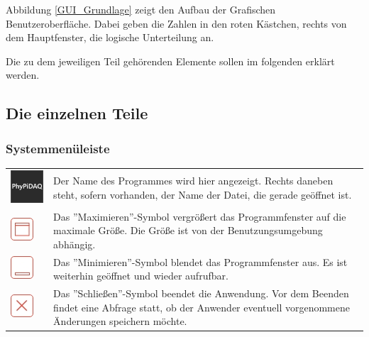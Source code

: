 \documentclass[parskip=full]{scrartcl}
\begin{document}
Abbildung \ref{GUI_Grundlage} zeigt den Aufbau der Grafischen Benutzeroberfläche. Dabei geben die Zahlen in den roten Kästchen, rechts von dem Hauptfenster, die logische Unterteilung an.

Die zu dem jeweiligen Teil gehörenden Elemente sollen im folgenden erklärt werden.

\subsection{Die einzelnen Teile}

\subsubsection{Systemmenüleiste}

\begin{tabular}[t]{p{1cm} p{10cm}}
	\vspace{0cm}\includegraphics[width = 1 cm]{Grafik/PhyPiDAQ.jpg} & Der Name des Programmes wird hier angezeigt. Rechts daneben steht, sofern vorhanden, der Name der Datei, die gerade geöffnet ist.\newline\\
	\vspace{0cm}\includegraphics[width = 1 cm]{Grafik/Maximieren.jpg} & Das ''Maximieren''-Symbol vergrößert das Programmfenster auf die maximale Größe. Die Größe ist von der Benutzungsumgebung abhängig.\newline\\
	\vspace{0cm}\includegraphics[width = 1 cm]{Grafik/Minimieren.jpg} & Das ''Minimieren''-Symbol blendet das Programmfenster aus. Es ist weiterhin geöffnet und wieder aufrufbar. \\
	\vspace{0cm}\includegraphics[width = 1 cm]{Grafik/Schliessen.jpg} & Das ''Schließen''-Symbol beendet die Anwendung. Vor dem Beenden findet eine Abfrage statt, ob der Anwender eventuell vorgenommene Änderungen speichern möchte.\newline\\
\end{tabular}
\end{document}
